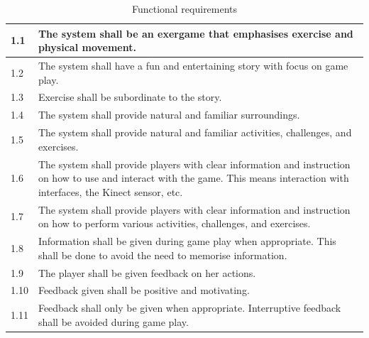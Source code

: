 \begin{table} [H]
\centering
\begin{tabular}{|>{\raggedright}p{}|p{}|}
\hline
1.1 & The system shall be an exergame that emphasises exercise and physical movement.  \\ \hline
1.2 & The system shall have a fun and entertaining story with focus on game play.  \\ \hline
1.3 & Exercise shall be subordinate to the story. \\ \hline
1.4 & The system shall provide natural and familiar surroundings. \\ \hline
1.5 & The system shall provide natural and familiar activities, challenges, and exercises.\\ \hline
1.6 & The system shall provide players with clear information and instruction on how to use and interact with the game. This means interaction with interfaces, the Kinect sensor, etc. \\ \hline
1.7 & The system shall provide players with clear information and instruction on how to perform various activities, challenges, and exercises. \\ \hline
1.8 & Information shall be given during game play when appropriate. This shall be done to avoid the need to memorise information. \\ \hline
1.9 & The player shall be given feedback on her actions.\\ \hline
1.10 & Feedback given shall be positive and motivating.\\ \hline
1.11 & Feedback shall only be given when appropriate. Interruptive feedback shall be avoided during game play. \\ \hline
    \end{tabular}
    \caption[Functional requirements, part 1]{Functional requirements}
    \label{tab:func1}
\end{table} 

